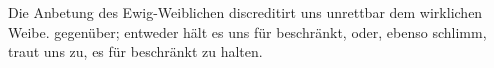 Die Anbetung des Ewig-Weiblichen discreditirt uns unrettbar dem wirklichen Weibe. gegenüber; entweder hält es uns für beschränkt, oder, ebenso schlimm, traut uns zu, es für beschränkt zu halten.
\par

